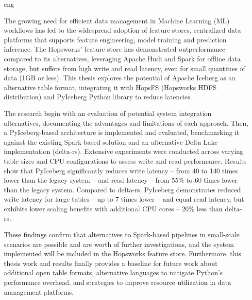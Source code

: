   \markboth{\abstractname}{}
\begin{scontents}[store-env=lang]
eng
\end{scontents}



\begin{scontents}[store-env=abstracts,print-env=true]
The growing need for efficient data management in Machine Learning (ML) workflows has led to the widespread adoption of feature stores, centralized data platforms that supports feature engineering, model training and prediction inference. The Hopsworks' feature store has demonstrated outperformance compared to its alternatives, leveraging Apache Hudi and Spark for offline data storage, but suffers from high write and read latency, even for small quantities of data (1GB or less). This thesis explores the potential of Apache Iceberg as an alternative table format, integrating it with HopsFS (Hopsworks HDFS distribution) and PyIceberg Python library to reduce latencies.

The research begin with an evaluation of potential system integration alternatives, documenting the advantages and limitations of each approach. Then, a PyIceberg-based architecture is implemented and evaluated, benchmarking it against the existing Spark-based solution and an alternative Delta Lake implementation (delta-rs). Extensive experiments were conducted across varying table sizes and CPU configurations to assess write and read performance. Results show that PyIceberg significantly reduces write latency -- from 40 to 140 times lower than the legacy system -- and read latency -- from 55\% to 60 times lower than the legacy system. Compared to delta-rs, PyIceberg demonstrates reduced write latency for large tables -- up to 7 times lower -- and equal read latency, but exhibits lower scaling benefits with additional CPU cores -- 20\% less than delta-rs.

These findings confirm that alternatives to Spark-based pipelines in small-scale scenarios are possible and are worth of further investigations, and the system implemented will be included in the Hopsworks feature store. Furthermore, this thesis work and results finally provides a baseline for future work about additional open table formats, alternative languages to mitigate Python's performance overhead, and strategies to improve resource utilization in data management platforms.


\end{scontents}
